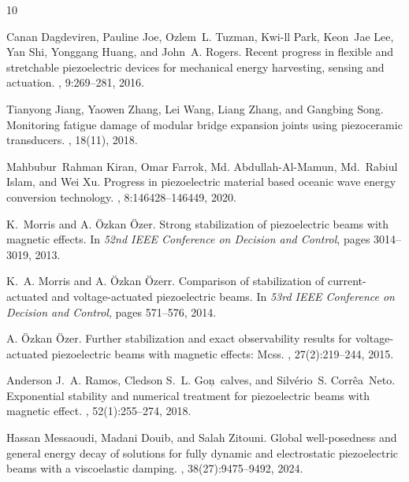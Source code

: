 \documentclass[12pt,reqno]{article}
\begin{document}
	
	\begin{thebibliography}{10}

Canan Dagdeviren, Pauline Joe, Ozlem~L. Tuzman, Kwi-ll Park, Keon~Jae Lee, Yan
  Shi, Yonggang Huang, and John~A. Rogers.
\newblock Recent progress in flexible and stretchable piezoelectric devices for
  mechanical energy harvesting, sensing and actuation.
, 9:269--281, 2016.

Tianyong Jiang, Yaowen Zhang, Lei Wang, Liang Zhang, and Gangbing Song.
\newblock Monitoring fatigue damage of modular bridge expansion joints using
  piezoceramic transducers.
, 18(11), 2018.

Mahbubur~Rahman Kiran, Omar Farrok, Md. Abdullah-Al-Mamun, Md.~Rabiul Islam,
  and Wei Xu.
\newblock Progress in piezoelectric material based oceanic wave energy
  conversion technology.
, 8:146428--146449, 2020.

K.~Morris and A. \"Ozkan \"Ozer.
\newblock Strong stabilization of piezoelectric beams with magnetic effects.
\newblock In {\em 52nd IEEE Conference on Decision and Control}, pages
  3014--3019, 2013.

K.~A. Morris and A. \"Ozkan \"Ozerr.
\newblock Comparison of stabilization of current-actuated and voltage-actuated
  piezoelectric beams.
\newblock In {\em 53rd IEEE Conference on Decision and Control}, pages
  571--576, 2014.

A. \"Ozkan \"Ozer.
\newblock Further stabilization and exact observability results for
  voltage-actuated piezoelectric beams with magnetic effects: Mcss.
, 27(2):219--244,
  2015.

Anderson J.~A. Ramos, Cledson S.~L. Gon\c~calves, and Silv\'erio~S.
  Corr\^ea~Neto.
\newblock Exponential stability and numerical treatment for piezoelectric beams
  with magnetic effect.
, 52(1):255--274, 2018.

Hassan Messaoudi, Madani Douib, and Salah Zitouni.
\newblock Global well-posedness and general energy decay of solutions for fully
  dynamic and electrostatic piezoelectric beams with a viscoelastic damping.
, 38(27):9475--9492, 2024.


\end{thebibliography}
\end{document}
